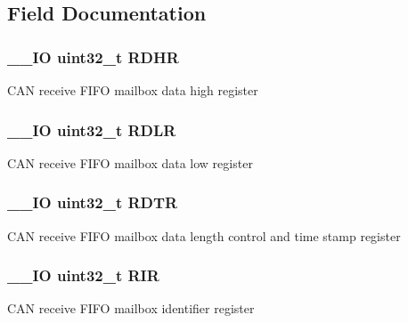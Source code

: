 \subsection{Field Documentation}
\hypertarget{struct_c_a_n___f_i_f_o_mail_box___type_def_a7f11f42ba9d3bc5cd4a4f5ea0214608e}{
\subsubsection[{R\-D\-H\-R}]{\setlength{\rightskip}{0pt plus 5cm}\-\_\-\-\_\-\-I\-O uint32\-\_\-t R\-D\-H\-R}}\label{struct_c_a_n___f_i_f_o_mail_box___type_def_a7f11f42ba9d3bc5cd4a4f5ea0214608e}
C\-A\-N receive F\-I\-F\-O mailbox data high register \hypertarget{struct_c_a_n___f_i_f_o_mail_box___type_def_ae1c569688eedd49219cd505b9c22121b}{
\subsubsection[{R\-D\-L\-R}]{\setlength{\rightskip}{0pt plus 5cm}\-\_\-\-\_\-\-I\-O uint32\-\_\-t R\-D\-L\-R}}\label{struct_c_a_n___f_i_f_o_mail_box___type_def_ae1c569688eedd49219cd505b9c22121b}
C\-A\-N receive F\-I\-F\-O mailbox data low register \hypertarget{struct_c_a_n___f_i_f_o_mail_box___type_def_a9563d8a88d0db403b8357331bea83a2e}{
\subsubsection[{R\-D\-T\-R}]{\setlength{\rightskip}{0pt plus 5cm}\-\_\-\-\_\-\-I\-O uint32\-\_\-t R\-D\-T\-R}}\label{struct_c_a_n___f_i_f_o_mail_box___type_def_a9563d8a88d0db403b8357331bea83a2e}
C\-A\-N receive F\-I\-F\-O mailbox data length control and time stamp register \hypertarget{struct_c_a_n___f_i_f_o_mail_box___type_def_a0acc8eb90b17bef5b9e03c7ddaacfb0b}{
\subsubsection[{R\-I\-R}]{\setlength{\rightskip}{0pt plus 5cm}\-\_\-\-\_\-\-I\-O uint32\-\_\-t R\-I\-R}}\label{struct_c_a_n___f_i_f_o_mail_box___type_def_a0acc8eb90b17bef5b9e03c7ddaacfb0b}
C\-A\-N receive F\-I\-F\-O mailbox identifier register 

